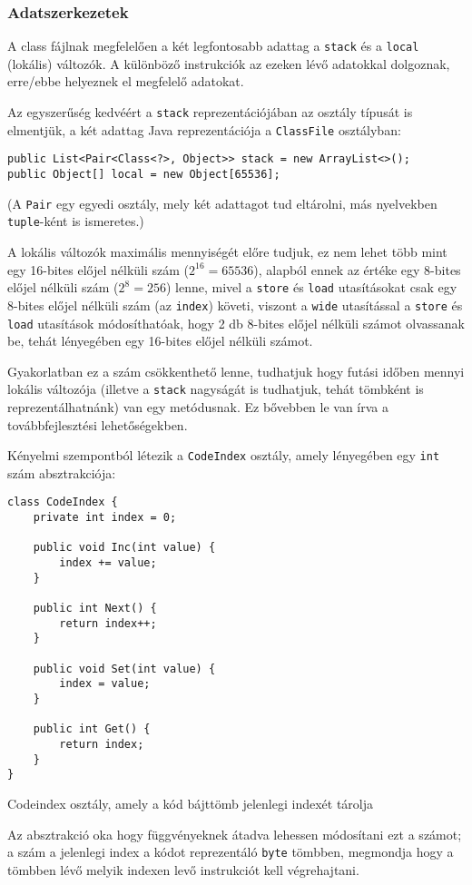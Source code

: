\subsubsection{Adatszerkezetek}

A class fájlnak megfelelően a két legfontosabb adattag a \lstinline{stack} és a \lstinline{local} (lokális) változók. A különböző instrukciók az ezeken lévő adatokkal dolgoznak, erre/ebbe helyeznek el megfelelő adatokat.

Az egyszerűség kedvéért a \lstinline{stack} reprezentációjában az osztály típusát is elmentjük, a két adattag Java reprezentációja a \lstinline{ClassFile} osztályban:
\begin{verbatim}
public List<Pair<Class<?>, Object>> stack = new ArrayList<>();
public Object[] local = new Object[65536];
\end{verbatim}
(A \lstinline{Pair} egy egyedi osztály, mely két adattagot tud eltárolni, más nyelvekben \lstinline{tuple}-ként is ismeretes.)

A lokális változók maximális mennyiségét előre tudjuk, ez nem lehet több mint egy 16-bites előjel nélküli szám ($2^{16} = 65536$), alapból ennek az értéke egy 8-bites előjel nélküli szám ($2^8 = 256$) lenne, mivel a \lstinline{store} és \lstinline{load} utasításokat csak egy 8-bites előjel nélküli szám (az \lstinline{index}) követi, viszont a \lstinline{wide} utasítással a \lstinline{store} és \lstinline{load} utasítások módosíthatóak, hogy 2 db 8-bites előjel nélküli számot olvassanak be, tehát lényegében egy 16-bites előjel nélküli számot.

Gyakorlatban ez a szám csökkenthető lenne, tudhatjuk hogy futási időben mennyi lokális változója (illetve a \lstinline{stack} nagyságát is tudhatjuk, tehát tömbként is reprezentálhatnánk) van egy metódusnak. Ez bővebben le van írva a továbbfejlesztési lehetőségekben.

Kényelmi szempontból létezik a \lstinline{CodeIndex} osztály, amely lényegében egy \lstinline{int} szám absztrakciója:
\begin{listing}[H]
\begin{verbatim}
class CodeIndex {
    private int index = 0;

    public void Inc(int value) {
        index += value;
    }

    public int Next() {
        return index++;
    }

    public void Set(int value) {
        index = value;
    }

    public int Get() {
        return index;
    }
}
\end{verbatim}
\caption{Codeindex osztály, amely a kód bájttömb jelenlegi indexét tárolja}
\end{listing}
Az absztrakció oka hogy függvényeknek átadva lehessen módosítani ezt a számot; a szám a jelenlegi index a kódot reprezentáló \lstinline{byte} tömbben, megmondja hogy a tömbben lévő melyik indexen levő instrukciót kell végrehajtani.

